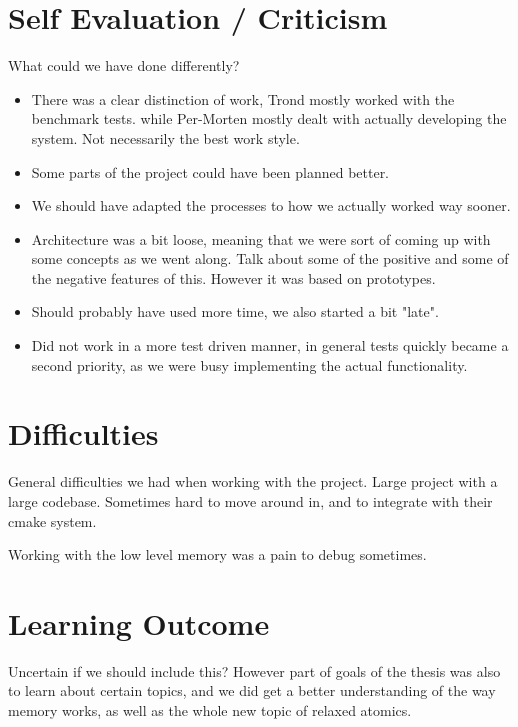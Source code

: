 \section{Self Evaluation / Criticism}
What could we have done differently?
\begin{itemize}
    \item
    There was a clear distinction of work, Trond mostly worked with the benchmark tests.
    while Per-Morten mostly dealt with actually developing the system.
    Not necessarily the best work style.

    \item
    Some parts of the project could have been planned better.

    \item
    We should have adapted the processes to how we actually worked way sooner.

    \item
    Architecture was a bit loose, meaning that we were sort of coming up with some concepts as we went along. Talk about some of the positive and some of the negative features of this.
    However it was based on prototypes.

    \item
    Should probably have used more time, we also started a bit "late".

    \item
    Did not work in a more test driven manner, in general tests quickly became a second priority,
    as we were busy implementing the actual functionality.
\end{itemize}

\section{Difficulties}
General difficulties we had when working with the project.
Large project with a large codebase. Sometimes hard to move around in, and to integrate with their cmake system.

Working with the low level memory was a pain to debug sometimes.

\section{Learning Outcome}
Uncertain if we should include this?
However part of goals of the thesis was also to learn about certain topics,
and we did get a better understanding of the way memory works, as well as the whole new topic of relaxed atomics.
